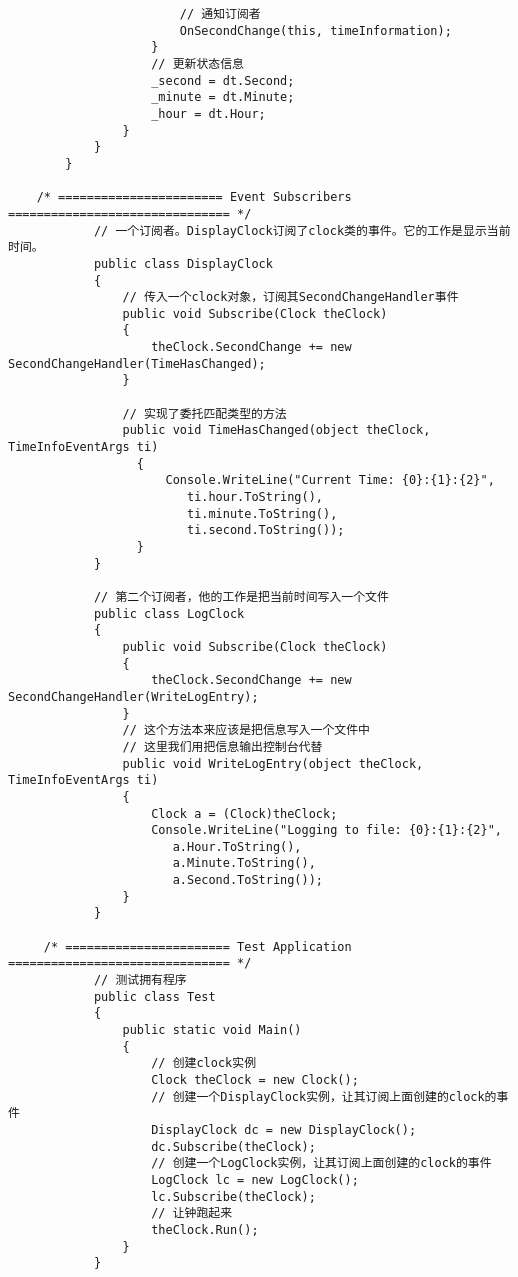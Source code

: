 \documentclass[UTF8,a4paper,12pt]{ctexbook}
\begin{document}
\begin{lstlisting}
	                    // 通知订阅者
	                    OnSecondChange(this, timeInformation);
	                }
	                // 更新状态信息
	                _second = dt.Second;
	                _minute = dt.Minute;
	                _hour = dt.Hour;
	            }
	        }
		}
		
	/* ======================= Event Subscribers =============================== */
		    // 一个订阅者。DisplayClock订阅了clock类的事件。它的工作是显示当前时间。
		    public class DisplayClock
		    {
		        // 传入一个clock对象，订阅其SecondChangeHandler事件
		        public void Subscribe(Clock theClock)
		        {
		            theClock.SecondChange += new SecondChangeHandler(TimeHasChanged);
		        }
		        
		        // 实现了委托匹配类型的方法
		        public void TimeHasChanged(object theClock, TimeInfoEventArgs ti)
			      {
			          Console.WriteLine("Current Time: {0}:{1}:{2}",
			             ti.hour.ToString(),
			             ti.minute.ToString(),
			             ti.second.ToString());
			      }
		    }
		    
		    // 第二个订阅者，他的工作是把当前时间写入一个文件
		    public class LogClock
		    {
		        public void Subscribe(Clock theClock)
		        {
		            theClock.SecondChange += new SecondChangeHandler(WriteLogEntry);
		        }
		        // 这个方法本来应该是把信息写入一个文件中
		        // 这里我们用把信息输出控制台代替
		        public void WriteLogEntry(object theClock, TimeInfoEventArgs ti)
		        {
		            Clock a = (Clock)theClock;
		            Console.WriteLine("Logging to file: {0}:{1}:{2}",
		               a.Hour.ToString(),
		               a.Minute.ToString(),
		               a.Second.ToString());
		        }
		    }
		    
 	 /* ======================= Test Application =============================== */
		    // 测试拥有程序
		    public class Test
		    {
		        public static void Main()
		        {
		            // 创建clock实例
		            Clock theClock = new Clock();
		            // 创建一个DisplayClock实例，让其订阅上面创建的clock的事件
		            DisplayClock dc = new DisplayClock();
		            dc.Subscribe(theClock);
		            // 创建一个LogClock实例，让其订阅上面创建的clock的事件
		            LogClock lc = new LogClock();
		            lc.Subscribe(theClock);
		            // 让钟跑起来
		            theClock.Run();
		        }
		    }
				\end{lstlisting}
			
\end{document}
